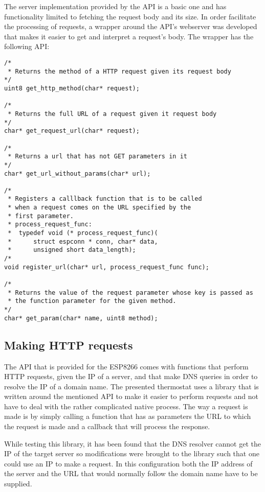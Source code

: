 The server implementation provided by the API is a basic one and has functionality limited to fetching the
request body and its size. In order facilitate the processing of requests, a wrapper around the API's webserver
was developed that makes it easier to get and interpret a request's body.
The wrapper has the following API:
\clearpage
\begin{lstlisting}[frame=single]
/*
 * Returns the method of a HTTP request given its request body
*/
uint8 get_http_method(char* request);

/*
 * Returns the full URL of a request given it request body
*/
char* get_request_url(char* request);

/*
 * Returns a url that has not GET parameters in it
*/
char* get_url_without_params(char* url);

/*
 * Registers a calllback function that is to be called
 * when a request comes on the URL specified by the
 * first parameter.
 * process_request_func:
 *  typedef void (* process_request_func)(
 *      struct espconn * conn, char* data,
 *      unsigned short data_length);
/*
void register_url(char* url, process_request_func func);

/*
 * Returns the value of the request parameter whose key is passed as
 * the function parameter for the given method.
*/
char* get_param(char* name, uint8 method);
\end{lstlisting}

\subsection{Making HTTP requests}

The API that is provided for the ESP8266 comes with functions that perform HTTP requests, given the IP of a
server, and that make DNS queries in order to resolve the IP of a domain name.
The presented thermostat uses a library \cite{website:httpclient_lib} that is written around the mentioned
API to make it easier to perform requests and not have to deal with the rather complicated native process.
The way a request is made is by simply calling a function that has as parameters the URL to which the request
is made and a callback that will process the response.

While testing this library, it has been found that the DNS resolver cannot get the IP of the target server
so modifications were brought to the library such that one could use an IP to make a request.
In this configuration both the IP address of the server and the URL that would normally follow the domain name
have to be supplied.

